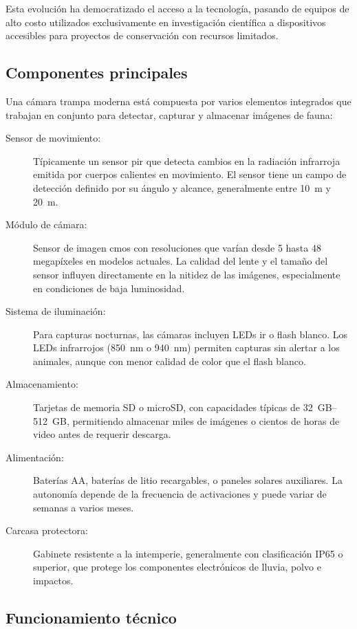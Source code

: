 \documentclass[a4paper, 12pt]{report}
\begin{document}
Esta evolución ha democratizado el acceso a la tecnología, pasando de equipos
de alto costo utilizados exclusivamente en investigación científica a
dispositivos accesibles para proyectos de conservación con recursos limitados.

\subsection{Componentes principales}

Una cámara trampa moderna está compuesta por varios elementos integrados que
trabajan en conjunto para detectar, capturar y almacenar imágenes de fauna:

\begin{description}
  \item[Sensor de movimiento:] Típicamente un sensor \gls{pir} que detecta
    cambios en la radiación infrarroja emitida por cuerpos calientes en
    movimiento. El sensor tiene un campo de detección definido por su
    ángulo y alcance, generalmente entre \qty{10}{m} y \qty{20}{m}.
  \item[Módulo de cámara:] Sensor de imagen \gls{cmos} con resoluciones que
    varían desde \num{5} hasta \num{48} megapíxeles en modelos actuales. La calidad
    del lente y el tamaño del sensor influyen directamente en la nitidez
    de las imágenes, especialmente en condiciones de baja luminosidad.
  \item[Sistema de iluminación:] Para capturas nocturnas, las cámaras incluyen
    LEDs \gls{ir} o flash blanco. Los LEDs infrarrojos (\qty{850}{nm} o \qty{940}{nm})
    permiten capturas sin alertar a los animales, aunque con menor calidad
    de color que el flash blanco.
  \item[Almacenamiento:] Tarjetas de memoria SD o microSD, con capacidades
    típicas de \qtyrange{32}{512}{GB}, permitiendo almacenar miles de imágenes o
    cientos de horas de video antes de requerir descarga.
  \item[Alimentación:] Baterías AA, baterías de litio recargables, o paneles
    solares auxiliares. La autonomía depende de la frecuencia de
    activaciones y puede variar de semanas a varios meses.
  \item[Carcasa protectora:] Gabinete resistente a la intemperie, generalmente
    con clasificación IP65 o superior, que protege los componentes
    electrónicos de lluvia, polvo e impactos.
\end{description}

\subsection{Funcionamiento técnico}
\end{document}
